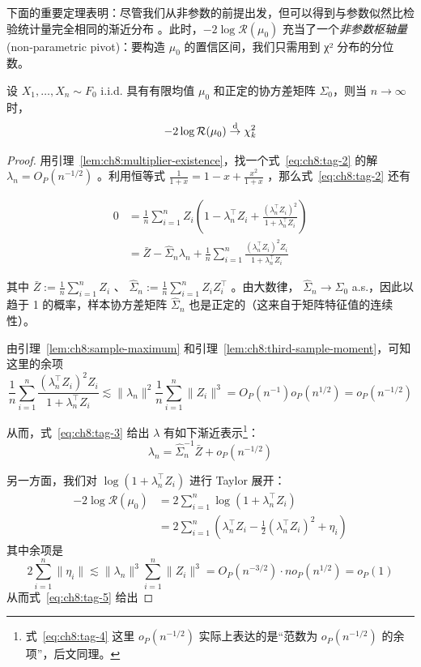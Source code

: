 下面的重要定理表明：尽管我们从非参数的前提出发，但可以得到与参数似然比检验统计量完全相同的渐近分布 。此时，$-2\log\mathcal{R}(\mu_0)$ 充当了一个\emph{非参数枢轴量}(non‑parametric pivot)：要构造 $\mu_0$ 的置信区间，我们只需用到 χ² 分布的分位数。

\begin{theorem}\label{thm:ch8:mean-wilks}

设 $X_1,\dots,X_n\sim F_0$ i.i.d. 具有有限均值 $\mu_0$ 和正定的协方差矩阵 $\Sigma_0$，则当 $n\to\infty$ 时，
\[-2\log\mathcal{R}(\mu_0) \overset{\rm d}\to \chi^2_k\]
\end{theorem}

\begin{proof}

用引理~\ref{lem:ch8:multiplier-existence}，找一个式~\eqref{eq:ch8:tag-2} 的解 $\lambda_n=O_P(n^{-1/2})$ 。利用恒等式 $\textstyle\frac1{1+x}=1-x+\frac{x^2}{1+x}$ ，那么式~\eqref{eq:ch8:tag-2} 还有

\begin{equation}
\label{eq:ch8:tag-3}
\begin{aligned} 0&=\frac{1}{n}\sum_{i=1}^{n}Z_{i}\!\left(1-\lambda_n^\top Z_{i}+\frac{(\lambda_n^\top Z_i)^{2}}{1+\lambda_n^\top Z_{i}}\right)\\[2mm] &=\bar{Z}-\widehat\Sigma_n\lambda_n+\frac{1}{n}\sum_{i=1}^{n}\frac{(\lambda_n^\top Z_i)^2Z_i}{1+\lambda_n^\top Z_i}  \end{aligned}
\end{equation}

其中 $\bar{Z}:=\frac1n\sum_{i=1}^nZ_i$ 、 $\widehat\Sigma_n:=\frac1n\sum_{i=1}^nZ_iZ_i^\top$ 。由大数律， $\widehat\Sigma_n\to \Sigma_0$ a.s.，因此以趋于 1 的概率，样本协方差矩阵 $\widehat\Sigma_n$ 也是正定的（这来自于矩阵特征值的连续性）。

由引理~\ref{lem:ch8:sample-maximum} 和引理~\ref{lem:ch8:third-sample-moment}，可知这里的余项 
$$\frac{1}{n}\sum_{i=1}^{n}\frac{(\lambda_n^\top Z_i)^2Z_i}{1+\lambda_n^\top Z_i} \lesssim \|\lambda_n\|^2\frac1n\sum_{i=1}^n\|Z_i\|^3=O_P(n^{-1})o_P(n^{1/2})=o_P(n^{-1/2})$$

从而，式~\eqref{eq:ch8:tag-3} 给出 $\lambda$ 有如下渐近表示\footnote{式~\ref{eq:ch8:tag-4} 这里 $o_P(n^{-1/2})$ 实际上表达的是``范数为 $o_P(n^{-1/2})$ 的余项''，后文同理。}：
\begin{equation}
\label{eq:ch8:tag-4}
\lambda_n = \widehat\Sigma_n^{-1}\bar{Z}+o_P(n^{-1/2})
\end{equation}


另一方面，我们对 $\log(1+\lambda_n^\top Z_i)$ 进行 Taylor 展开：
\begin{equation}
\label{eq:ch8:tag-5}
\begin{aligned} -2\log \mathcal R(\mu_0)&=2\sum_{i=1}^n\log(1+\lambda_n^\top Z_i)\\ &=2\sum_{i=1}^n\left(\lambda_n^\top Z_i-\frac12(\lambda_n^\top Z_i)^2+\eta_i\right) \end{aligned}
\end{equation}
其中余项是 \[ 2\sum_{i=1}^n\|\eta_i\|\lesssim \|\lambda_n\|^3\sum_{i=1}^n\|Z_i\|^3=O_P(n^{-3/2})\cdot no_P(n^{1/2})=o_P(1) \]从而式~\eqref{eq:ch8:tag-5} 给出


\end{proof}
